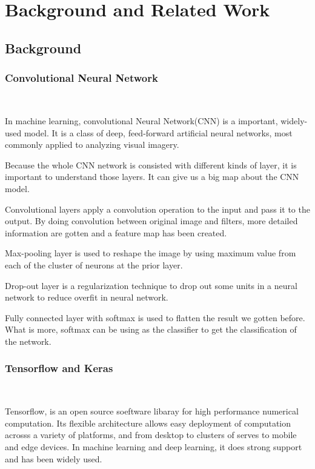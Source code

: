 \documentclass[conference]{IEEEtran}
\begin{document}
\section{Background and Related Work}

\subsection{Background}

\subsubsection{Convolutional Neural Network}

\

\noindent
In machine learning, convolutional Neural Network(CNN) is a important, widely-used model. It is a class of deep, feed-forward artificial neural networks, most commonly applied to analyzing visual imagery. 

Because the whole CNN network is consisted with different kinds of layer, it is important to understand those layers. It can give us a big map about the CNN model. 

Convolutional layers apply a convolution operation to the input and pass it to the output. By doing convolution between original image and filters, more detailed information are gotten and a feature map has been created.

Max-pooling layer is used to reshape the image by using maximum value from each of the cluster of neurons at the prior layer.

Drop-out layer is a regularization technique to drop out some units in a neural network to reduce overfit in neural network.

Fully connected layer with softmax is used to flatten the result we gotten before. What is more, softmax can be using as the classifier to get the classification of the network.


\subsubsection{Tensorflow and Keras}

\

\noindent

Tensorflow, is an open source soeftware libaray for high performance numerical computation. Its flexible architecture allows easy deployment of computation acrosss a variety of platforms, and from desktop to clusters of serves to mobile and edge devices. In machine learning and deep learning, it does strong support and has been widely used.
\end{document}
